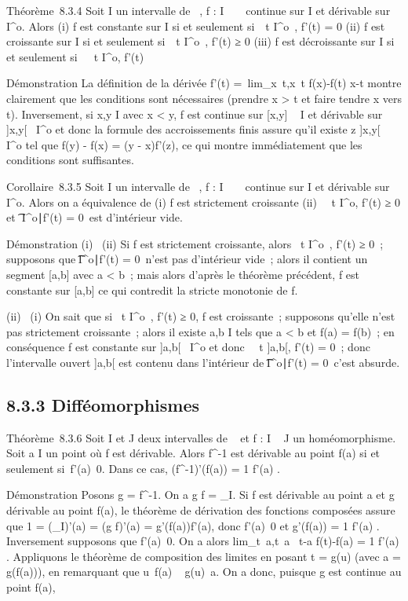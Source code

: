 Théorème~8.3.4 Soit I un intervalle de ~, f : I \rightarrow~ ~ continue sur I et
dérivable sur I^o. Alors (i) f est constante sur I si et
seulement si~\forall~t \in I^o~, f'(t) = 0
(ii) f est croissante sur I si et seulement
si~\forall~t \in I^o~, f'(t) ≥ 0 (iii) f est
décroissante sur I si et seulement si~\forall~~t \in
I^o, f'(t) 

Démonstration La définition de la dérivée f'(t)
=\
lim_x\rightarrow~t,x\neq~t f(x)-f(t)
\over x-t montre clairement que les conditions sont
nécessaires (prendre x > t et faire tendre x vers t).
Inversement, si x,y \in I avec x < y, f est continue sur
[x,y] \subset~ I et dérivable sur ]x,y[\subset~ I^o et donc la
formule des accroissements finis assure qu'il existe z \in]x,y[\subset~
I^o tel que f(y) - f(x) = (y - x)f'(z), ce qui montre
immédiatement que les conditions sont suffisantes.

Corollaire~8.3.5 Soit I un intervalle de ~, f : I \rightarrow~ ~ continue sur I et
dérivable sur I^o. Alors on a équivalence de (i) f est
strictement croissante (ii) \forall~~t \in
I^o, f'(t) ≥ 0 et \t \in
I^o∣f'(t) = 0\
est d'intérieur vide.

Démonstration (i) \rigtharrow~(ii) Si f est strictement croissante, alors
\forall~t \in I^o~, f'(t) ≥ 0~; supposons que
\t \in I^o∣f'(t) =
0\ n'est pas d'intérieur vide~; alors il contient un
segment [a,b] avec a < b~; mais alors d'après le théorème
précédent, f est constante sur [a,b] ce qui contredit la stricte
monotonie de f.

(ii) \rigtharrow~(i) On sait que si \forall~t \in I^o~,
f'(t) ≥ 0, f est croissante~; supposons qu'elle n'est pas strictement
croissante~; alors il existe a,b \in I tels que a < b et f(a) =
f(b)~; en conséquence f est constante sur ]a,b[\subset~ I^o et
donc \forall~~t \in]a,b[, f'(t) = 0~; donc
l'intervalle ouvert ]a,b[ est contenu dans l'intérieur de
\t \in I^o∣f'(t) =
0\, c'est absurde.

\subsection{8.3.3 Difféomorphismes}

Théorème~8.3.6 Soit I et J deux intervalles de ~ et f : I \rightarrow~ J un
homéomorphisme. Soit a \in I un point où f est dérivable. Alors
f^-1 est dérivable au point f(a) si et seulement
si~f'(a)\neq~0. Dans ce cas,
(f^-1)'(f(a)) = 1 \over f'(a) .

Démonstration Posons g = f^-1. On a g \cdot f =
\mathrmId_I. Si f est dérivable au point a et
g dérivable au point f(a), le théorème de dérivation des fonctions
composées assure que 1 = (\mathrmId_I)'(a) =
(g \cdot f)'(a) = g'(f(a))f'(a), donc f'(a)\neq~0 et
g'(f(a)) = 1 \over f'(a) . Inversement supposons que
f'(a)\neq~0. On a alors
lim_t\rightarrow~a,t\neq~a~
t-a \over f(t)-f(a) = 1 \over f'(a)
. Appliquons le théorème de composition des limites en posant t = g(u)
(avec a = g(f(a))), en remarquant que u\neq~f(a)
\rigtharrow~ g(u)\neq~a. On a donc, puisque g est continue
au point f(a),

